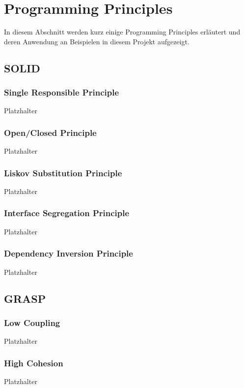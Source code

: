 \documentclass[12pt]{article}
\begin{document}
\newpage

\section{Programming Principles}
In diesem Abschnitt werden kurz einige Programming Principles erläutert und deren Anwendung an Beispielen in diesem Projekt aufgezeigt.

\subsection{SOLID}
\subsubsection{Single Responsible Principle}
Platzhalter

\subsubsection{Open/Closed Principle}
Platzhalter

\subsubsection{Liskov Substitution Principle}
Platzhalter

\subsubsection{Interface Segregation Principle}
Platzhalter

\subsubsection{Dependency Inversion Principle}
Platzhalter

\subsection{GRASP}

\subsubsection{Low Coupling}
Platzhalter

\subsubsection{High Cohesion}
Platzhalter
\end{document}
